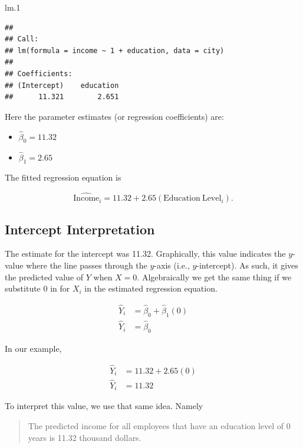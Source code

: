 \documentclass[]{book}
\newenvironment{Shaded}{\begin{snugshade}}{\end{snugshade}}
\newcommand{\FloatTok}[1]{\textcolor[rgb]{0.00,0.00,0.81}{#1}}
\newcommand{\NormalTok}[1]{#1}
\providecommand{\tightlist}{%
  \setlength{\itemsep}{0pt}\setlength{\parskip}{0pt}}
\theoremstyle{definition}
\theoremstyle{definition}
\theoremstyle{definition}
\theoremstyle{remark}
\begin{document}
\begin{Shaded}
\begin{Highlighting}[]
\NormalTok{lm}\FloatTok{.1}
\end{Highlighting}
\end{Shaded}

\begin{verbatim}
## 
## Call:
## lm(formula = income ~ 1 + education, data = city)
## 
## Coefficients:
## (Intercept)    education  
##      11.321        2.651
\end{verbatim}

Here the parameter estimates (or regression coefficients) are:

\begin{itemize}
\tightlist
\item
  \(\hat{\beta}_0 = 11.32\)
\item
  \(\hat{\beta}_1 = 2.65\)
\end{itemize}

The fitted regression equation is

\[
\hat{\mathrm{Income}}_i = 11.32 + 2.65(\mathrm{Education~Level}_i).
\]

\hypertarget{intercept-interpretation}{%
\subsection{Intercept Interpretation}\label{intercept-interpretation}}

The estimate for the intercept was 11.32. Graphically, this value
indicates the \(y\)-value where the line passes through the \(y\)-axis
(i.e., \(y\)-intercept). As such, it gives the predicted value of \(Y\)
when \(X = 0\). Algebraically we get the same thing if we substitute 0
in for \(X_i\) in the estimated regression equation.

\[
\begin{split}
\hat{Y}_i &= \hat{\beta}_0 + \hat{\beta}_1(0) \\
\hat{Y}_i &= \hat{\beta}_0 
\end{split}
\]

In our example,

\[
\begin{split}
\hat{Y}_i &= 11.32 + 2.65(0) \\
\hat{Y}_i &= 11.32 
\end{split}
\]

To interpret this value, we use that same idea. Namely

\begin{quote}
The predicted income for all employees that have an education level of 0
years is 11.32 thousand dollars.
\end{quote}
\end{document}
